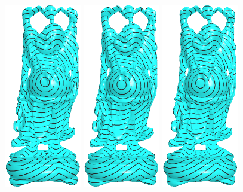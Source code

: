 \begin{figure}[htbp]
\centering
\includegraphics[width=0.3\textwidth]{figs/svg/buddha_nf40k_svg_RMS_0_16.png}
\includegraphics[width=0.3\textwidth]{figs/svg/buddha_nf300k_svg_RMS_0_11.png}
\includegraphics[width=0.3\textwidth]{figs/svg/buddha_nf600k_SVG_RMS_0_12.png}\\

\end{figure}
